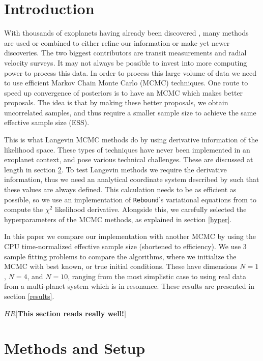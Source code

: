 \documentclass{aa}
\def\memohr#1{\color{blue}$HR[${\bf #1}$]$ \color{black}}
\begin{document}
\section{Introduction}
With thousands of exoplanets having already been discovered \cite{exoArchive}, many methods are used or combined to either refine our information or make yet newer discoveries. 
The two biggest contributors are transit measurements and radial velocity surveys. 
It may not always be possible to invest into more computing power to process this data. 
In order to process this large volume of data we need to use efficient Markov Chain Monte Carlo (MCMC) techniques. 
One route to speed up convergence of posteriors is to have an MCMC which makes better proposals. 
The idea is that by making these better proposals, we obtain uncorrelated samples, and thus require a smaller sample size to achieve the same effective sample size (ESS).

This is what Langevin MCMC methods do by using derivative information of the likelihood space. 
These types of techniques have never been implemented in an exoplanet context, and pose various technical challenges. 
These are discussed at length in section \ref{setup}. 
To test Langevin methods we require the derivative information, thus we need an analytical coordinate system described by \cite{Pl2009} such that these values are always defined. 
This calculation needs to be as efficient as possible, so we use an implementation of \texttt{Rebound}'s variational equations from \cite{Rein2016} to compute the $\chi^2$ likelihood derivative. 
Alongside this, we carefully selected the hyperparameters of the MCMC methods, as explained in section \ref{hyper}.

In this paper we compare our implementation with another MCMC by using the CPU time-normalized effective sample size (shortened to efficiency). 
We use 3 sample fitting problems to compare the algorithms, where we initialize the MCMC with best known, or true initial conditions. 
These have dimensions $N=1$, $N=4$, and $N=10$, ranging from the most simplistic case to using real data from a multi-planet system which is in resonance. 
These results are presented in section \ref{results}.

\memohr{This section reads really well!}
 
\section{Methods and Setup}\label{setup}
\end{document}
